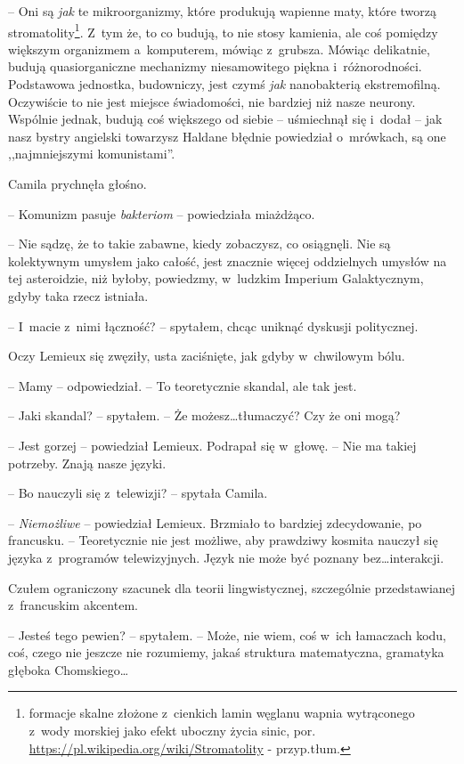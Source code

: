 \documentclass[oneside,polish,12pt,sfheadings]{mwbk}
\begin{document}
-- Oni są \emph{jak} te mikroorganizmy, które produkują wapienne maty, które
tworzą stromatolity\footnote{formacje skalne złożone z~cienkich lamin węglanu wapnia wytrąconego z~wody morskiej jako efekt
uboczny życia sinic, por. \url{https://pl.wikipedia.org/wiki/Stromatolity} -
przyp.tłum.}. Z~tym że, to co budują, to nie stosy kamienia, ale coś
pomiędzy większym organizmem a~komputerem, mówiąc z~grubsza. Mówiąc
delikatnie, budują quasiorganiczne mechanizmy niesamowitego piękna i~różnorodności. Podstawowa jednostka, budowniczy, jest czymś \emph{jak }
nanobakterią ekstremofilną. Oczywiście to nie jest miejsce świadomości,
nie bardziej niż nasze neurony. Wspólnie jednak, budują coś większego od
siebie -- uśmiechnął się i~dodał -- jak nasz bystry angielski towarzysz
Haldane błędnie powiedział o~mrówkach, są one ,,najmniejszymi
komunistami''.

Camila prychnęła głośno. 

-- Komunizm pasuje \emph{bakteriom} -- powiedziała miażdżąco.

-- Nie sądzę, że to takie zabawne, kiedy zobaczysz, co osiągnęli. Nie są
kolektywnym umysłem jako całość, jest znacznie więcej oddzielnych
umysłów na tej asteroidzie, niż byłoby, powiedzmy, w~ludzkim Imperium
Galaktycznym, gdyby taka rzecz istniała.

-- I~macie z~nimi łączność? -- spytałem, chcąc uniknąć dyskusji
politycznej.

Oczy Lemieux się zwęziły, usta zaciśnięte, jak gdyby w~chwilowym bólu. 

-- Mamy -- odpowiedział. -- To teoretycznie skandal, ale tak jest.

-- Jaki skandal? -- spytałem. -- Że możesz\ldots tłumaczyć? Czy że oni mogą?

-- Jest gorzej -- powiedział Lemieux. Podrapał się w~głowę. -- Nie ma takiej
potrzeby. Znają nasze języki.

-- Bo nauczyli się z~telewizji? -- spytała Camila.

-- \emph{Niemożliwe} -- powiedział Lemieux. Brzmiało to bardziej
zdecydowanie, po francusku. -- Teoretycznie nie jest możliwe, aby
prawdziwy kosmita nauczył się języka z~programów telewizyjnych. Język
nie może być poznany bez\ldots interakcji.

Czułem ograniczony szacunek dla teorii lingwistycznej, szczególnie
przedstawianej z~francuskim akcentem.

-- Jesteś tego pewien? -- spytałem. -- Może, nie wiem, coś w~ich łamaczach
kodu, coś, czego nie jeszcze nie rozumiemy, jakaś struktura
matematyczna, gramatyka głęboka Chomskiego\ldots
\end{document}
